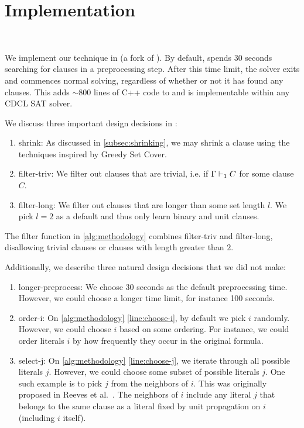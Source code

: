 \section{Implementation}~\label{sec:implementation}

We implement our technique in \tool (a fork of \cadical
). By default, \tool spends 30 seconds searching for \pr clauses in a preprocessing step. After this time limit, the solver exits and commences normal solving,
regardless of whether or not it has found any \pr clauses. This adds $\sim\!800$ lines
of C++ code to \cadical and is implementable within any CDCL SAT solver.

We discuss three important design decisions in \tool:

\begin{enumerate}
  \item \textsf{shrink}: As discussed in \autoref{subsec:shrinking}, we may
  shrink a clause using the techniques inspired by Greedy Set Cover.
  \item \textsf{filter-triv}: We filter out clauses that are trivial, i.e. if
  $\Gamma \vdash_1 C$ for some clause $C$.
  \item \textsf{filter-long}: We filter out clauses that are longer than some
  set length $l$. We pick $l = 2$ as a default and thus only learn binary and unit
  clauses.
\end{enumerate}

The filter function in \autoref{alg:methodology} combines \textsf{filter-triv} and \textsf{filter-long},
disallowing trivial clauses or clauses with length greater than $2$.

Additionally, we describe three natural design decisions that we did not make:

\begin{enumerate}
  \item \textsf{longer-preprocess}: We choose 30 seconds as the default
  preprocessing time. However, we could choose a longer time limit, for instance
  100 seconds.
  \item \textsf{order-i}: On \autoref{alg:methodology} \autoref{line:choose-i},
  by default we pick $i$ randomly. However, we could choose $i$ based
  on some ordering. For instance, we could order literals $i$ by how frequently
  they occur in the original formula.
  \item \textsf{select-j}: On \autoref{alg:methodology} \autoref{line:choose-j},
  we iterate through all possible literals $j$. However, we
  could choose some subset of possible literals $j$. One such example is to pick $j$ from 
  the neighbors of $i$. This was originally proposed in Reeves et al.~\cite{prelearn}.
  The neighbors of $i$ include any literal $j$ that belongs to the same clause as
  a literal fixed by unit propagation on $i$ (including $i$ itself).
\end{enumerate}

